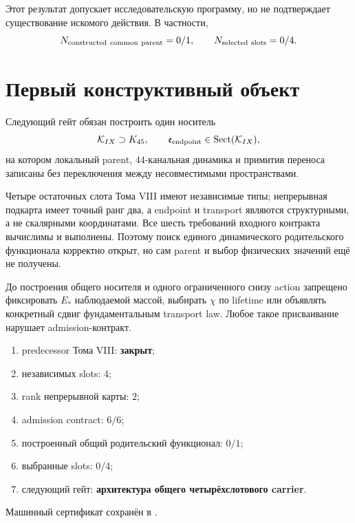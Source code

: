 Этот результат допускает исследовательскую программу, но не подтверждает
существование искомого действия. В частности,
\begin{equation}
 N_{\rm constructed\ common\ parent}=0/1,
 \qquad N_{\rm selected\ slots}=0/4.
 \label{eq:v9-admission-construction-ledger}
\end{equation}

\section{Первый конструктивный объект}

Следующий гейт обязан построить один носитель
\begin{equation}
 \mathcal K_{IX}\supset K_{45},
 \qquad
 \mathfrak e_{\rm endpoint}\in\operatorname{Sect}(\mathcal K_{IX}),
 \label{eq:v9-admission-common-carrier-target}
\end{equation}
на котором локальный parent, $44$-канальная динамика и примитив переноса
записаны без переключения между несовместимыми пространствами.

\begin{theorem}
Четыре остаточных слота Тома VIII имеют независимые типы; непрерывная
подкарта имеет точный ранг два, а endpoint и transport являются
структурными, а не скалярными координатами. Все шесть требований входного
контракта вычислимы и выполнены. Поэтому поиск единого динамического родительского функционала
корректно открыт, но сам parent и выбор физических значений ещё не получены.
\end{theorem}

\begin{nogocriterion}
До построения общего носителя и одного ограниченного снизу action запрещено
фиксировать $E_*$ наблюдаемой массой, выбирать $\chi$ по lifetime или
объявлять конкретный сдвиг фундаментальным transport law. Любое такое
присваивание нарушает admission-контракт.
\end{nogocriterion}

\begin{protocol}\begin{enumerate}
\item predecessor Тома VIII: \textbf{закрыт};
\item независимых slots: \textbf{$4$};
\item rank непрерывной карты: \textbf{$2$};
\item admission contract: \textbf{$6/6$};
\item построенный общий родительский функционал: \textbf{$0/1$};
\item выбранные slots: \textbf{$0/4$};
\item следующий гейт: \textbf{архитектура общего четырёхслотового carrier}.
\end{enumerate}\end{protocol}

Машинный сертификат сохранён в
.